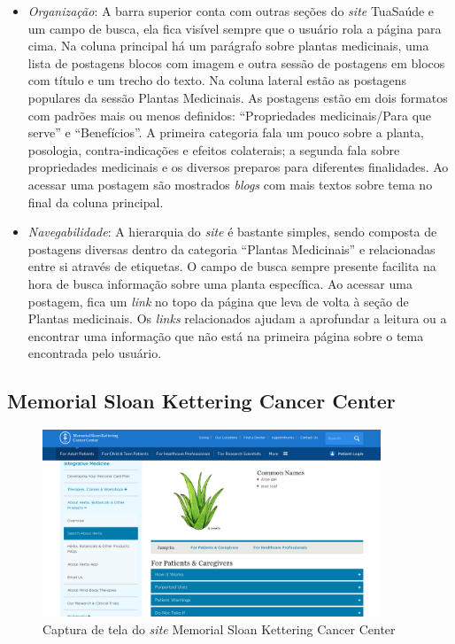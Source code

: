 \begin{itemize}
\item
  \emph{Organização}: A barra superior conta com outras seções do \emph{site} TuaSaúde e um campo de busca, ela fica visível sempre que o usuário rola a página para cima. Na coluna principal há um parágrafo sobre plantas medicinais, uma lista de postagens blocos com imagem e outra sessão de postagens em blocos com título e um trecho do texto. Na coluna lateral estão as postagens populares da sessão Plantas Medicinais. As postagens estão em dois formatos com padrões mais ou menos definidos: ``Propriedades medicinais/Para que serve'' e ``Benefícios''. A primeira categoria fala um pouco sobre a planta, posologia, contra-indicações e efeitos colaterais; a segunda fala sobre propriedades medicinais e os diversos preparos para diferentes finalidades. Ao acessar uma postagem são mostrados \emph{blogs} com mais textos sobre tema no final da coluna principal.
\item
  \emph{Navegabilidade}: A hierarquia do \emph{site} é bastante simples, sendo composta de postagens diversas dentro da categoria ``Plantas Medicinais'' e relacionadas entre si através de etiquetas. O campo de busca sempre presente facilita na hora de busca informação sobre uma planta específica. Ao acessar uma postagem, fica um \emph{link} no topo da página que leva de volta à seção de Plantas medicinais. Os \emph{links} relacionados ajudam a aprofundar a leitura ou a encontrar uma informação que não está na primeira página sobre o tema encontrada pelo usuário.
\end{itemize}

\subsection{Memorial Sloan Kettering Cancer Center}\label{memorial-sloan-kettering-cancer-center}

\begin{figure}
\centering
\caption{\label{fig-mskcc}Captura de tela do \emph{site} Memorial Sloan Kettering Cancer Center}
\includegraphics[width=0.9\textwidth]{images/similares/mskcc.png}
\end{figure}

